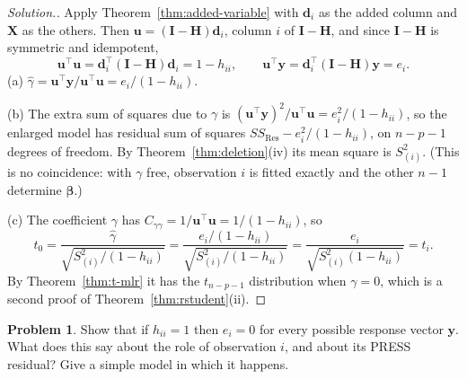 \documentclass[11pt,a4paper]{article}
\numberwithin{equation}{section}
\theoremstyle{definition}
\newtheorem{problemx}{Problem}[subsection]
\newenvironment{problem}{\begin{problemx}}{\end{problemx}}
\newenvironment{solution}
  {\renewcommand{\qedsymbol}{}\begin{proof}[\textit{Solution}.]}
  {\end{proof}}
\begin{document}
\begin{solution}
Apply Theorem~\ref{thm:added-variable} with $\mathbf{d}_i$ as the added column and
$\mathbf{X}$ as the others. Then
$\mathbf{u} = (\mathbf{I} - \mathbf{H})\mathbf{d}_i$, column $i$ of $\mathbf{I} - \mathbf{H}$,
and since $\mathbf{I} - \mathbf{H}$ is symmetric and idempotent,
\[
\mathbf{u}^\top\mathbf{u} = \mathbf{d}_i^\top(\mathbf{I} - \mathbf{H})\mathbf{d}_i = 1 - h_{ii},
\qquad
\mathbf{u}^\top\mathbf{y} = \mathbf{d}_i^\top(\mathbf{I} - \mathbf{H})\mathbf{y} = e_i .
\]
(a) $\hat\gamma = \mathbf{u}^\top\mathbf{y}/\mathbf{u}^\top\mathbf{u} = e_i/(1 - h_{ii})$.

(b) The extra sum of squares due to $\gamma$ is
$(\mathbf{u}^\top\mathbf{y})^2/\mathbf{u}^\top\mathbf{u} = e_i^2/(1 - h_{ii})$, so the
enlarged model has residual sum of squares $SS_{\mathrm{Res}} - e_i^2/(1 - h_{ii})$, on
$n - p - 1$ degrees of freedom. By Theorem~\ref{thm:deletion}(iv) its mean square is
$S^2_{(i)}$. (This is no coincidence: with $\gamma$ free, observation $i$ is fitted exactly
and the other $n - 1$ determine $\boldsymbol\beta$.)

(c) The coefficient $\gamma$ has $C_{\gamma\gamma} = 1/\mathbf{u}^\top\mathbf{u} = 1/(1 - h_{ii})$,
so
\[
t_0 = \frac{\hat\gamma}{\sqrt{S^2_{(i)}/(1 - h_{ii})}}
= \frac{e_i/(1 - h_{ii})}{\sqrt{S^2_{(i)}/(1 - h_{ii})}}
= \frac{e_i}{\sqrt{S^2_{(i)}(1 - h_{ii})}} = t_i .
\]
By Theorem~\ref{thm:t-mlr} it has the $t_{n - p - 1}$ distribution when $\gamma = 0$, which
is a second proof of Theorem~\ref{thm:rstudent}(ii).
\end{solution}

\begin{problem}\label{prob:hii-one}
Show that if $h_{ii} = 1$ then $e_i = 0$ for every possible response vector $\mathbf{y}$.
What does this say about the role of observation $i$, and about its PRESS residual? Give a
simple model in which it happens.
\end{problem}
\end{document}
